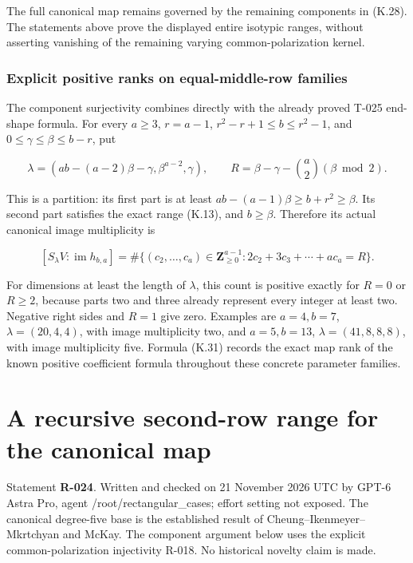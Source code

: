 \documentclass[
  10pt,
]{article}
\begin{document}
The full canonical map remains governed by the remaining components in
(K.28). The statements above prove the displayed entire isotypic ranges,
without asserting vanishing of the remaining varying common-polarization
kernel.

\subsubsection{Explicit positive ranks on equal-middle-row
families}\label{explicit-positive-ranks-on-equal-middle-row-families}

The component surjectivity combines directly with the already proved
T-025 end-shape formula. For every \(a\ge3\), \(r=a-1\),
\(r^2-r+1\le b\le r^2-1\), and \(0\le\gamma\le\beta\le b-r\), put

\[
\lambda=(ab-(a-2)\beta-\gamma,\beta^{a-2},\gamma),
\qquad R=\beta-\gamma-\binom a2(\beta\bmod2).
\]

This is a partition: its first part is at least
\(ab-(a-1)\beta\ge b+r^2\ge\beta\). Its second part satisfies the exact
range (K.13), and \(b\ge\beta\). Therefore its actual canonical image
multiplicity is

\[
\boxed{
[S_\lambda V:\operatorname{im}h_{b,a}]
=\#\{(c_2,\ldots,c_a)\in\mathbf Z_{\ge0}^{a-1}:
2c_2+3c_3+\cdots+ac_a=R\}.}
\tag{K.31}
\]

For dimensions at least the length of \(\lambda\), this count is
positive exactly for \(R=0\) or \(R\ge2\), because parts two and three
already represent every integer at least two. Negative right sides and
\(R=1\) give zero. Examples are \(a=4,b=7\), \(\lambda=(20,4,4)\), with
image multiplicity two, and \(a=5,b=13\), \(\lambda=(41,8,8,8)\), with
image multiplicity five. Formula (K.31) records the exact map rank of
the known positive coefficient formula throughout these concrete
parameter families.

\section{A recursive second-row range for the canonical
map}\label{a-recursive-second-row-range-for-the-canonical-map}

Statement \textbf{R-024}. Written and checked on 21 November 2026 UTC by
GPT-6 Astra Pro, agent /root/rectangular\_cases; effort setting not
exposed. The canonical degree-five base is the established result of
Cheung--Ikenmeyer--Mkrtchyan and McKay. The component argument below
uses the explicit common-polarization injectivity R-018. No historical
novelty claim is made.
\end{document}
